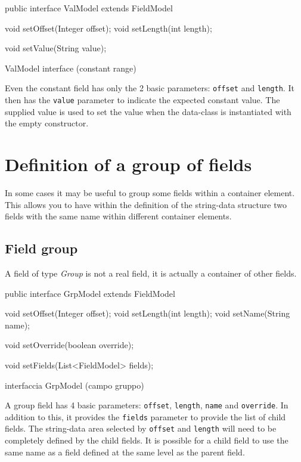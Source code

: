 \documentclass[a4paper,10pt]{report}
\newenvironment{elisting}[1][H]
  {\captionsetup{aboveskip=0pt}\begin{listing}[#1]}
  {\end{listing}%
}
\begin{document}
\begin{elisting}[!htb]
\begin{javacode}
public interface ValModel extends FieldModel {
    void setOffset(Integer offset);
    void setLength(int length);
    
    void setValue(String value);
}
\end{javacode}
\caption{ValModel interface (constant range)}
\label{lst:ValModel}
\end{elisting}

Even the constant field has only the 2 basic parameters: \verb!offset! and 
\verb!length!. It then has the \verb!value! parameter to indicate the expected 
constant value. The supplied value is used to set the value when the data-class 
is instantiated with the empty constructor.


\chapter{Definition of a group of fields}
In some cases it may be useful to group some fields within a container element. 
This allows you to have within the definition of the string-data structure two 
fields with the same name within different container elements.

\section{Field group}
A field of type \textsl{Group} is not a real field, it is actually a container 
of other fields.

\begin{elisting}[!htb]
\begin{javacode}
public interface GrpModel extends FieldModel {
    void setOffset(Integer offset);
    void setLength(int length);
    void setName(String name);
    
    void setOverride(boolean override);
    
    void setFields(List<FieldModel> fields);
}
\end{javacode}
\caption{interfaccia GrpModel (campo gruppo)}
\label{lst:GrpModel}
\end{elisting}

A group field has 4 basic parameters: \verb!offset!, \verb!length!, \verb!name! 
and \verb!override!. 
In addition to this, it provides the \verb!fields! parameter to provide the list 
of child fields. 
The string-data area selected by \verb!offset! and \verb!length! will need to be 
completely defined by the child fields. 
It is possible for a child field to use the same name as a field defined at the 
same level as the parent field.
\end{document}
